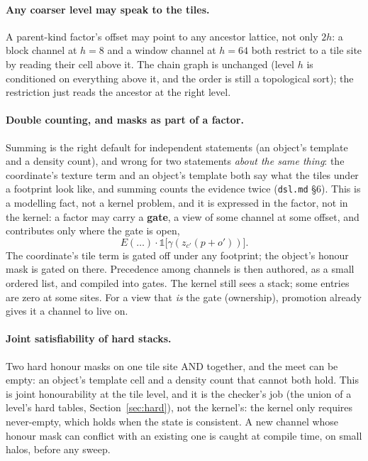 \documentclass[11pt]{article}
\newcommand{\1}{\mathds{1}}
\begin{document}
\paragraph{Any coarser level may speak to the tiles.} A parent-kind factor's
offset may point to any ancestor lattice, not only $2h$: a block channel at
$h = 8$ and a window channel at $h = 64$ both restrict to a tile site by
reading their cell above it. The chain graph is unchanged (level $h$ is
conditioned on everything above it, and the order is still a topological
sort); the restriction just reads the ancestor at the right level.

\paragraph{Double counting, and masks as part of a factor.} Summing is the
right default for independent statements (an object's template and a density
count), and wrong for two statements \emph{about the same thing}: the coordinate's
texture term and an object's template both say what the tiles under a
footprint look like, and summing counts the evidence twice (\texttt{dsl.md}
\S6). This is a modelling fact, not a kernel problem, and it is expressed in
the factor, not in the kernel: a factor may carry a \textbf{gate}, a view of
some channel at some offset, and contributes only where the gate is open,
\[
  E(\ldots)\cdot \1\big[\gamma(z_{c'}(p + o'))\big].
\]
The coordinate's tile term is gated off under any footprint; the object's
honour mask is gated on there. Precedence among channels is then authored, as
a small ordered list, and compiled into gates. The kernel still sees a stack;
some entries are zero at some sites. For a view that \emph{is} the gate
(ownership), promotion already gives it a channel to live on.

\paragraph{Joint satisfiability of hard stacks.} Two hard honour masks on one
tile site AND together, and the meet can be empty: an object's template cell
and a density count that cannot both hold. This is joint honourability at the
tile level, and it is the checker's job (the union of a level's hard tables,
Section~\ref{sec:hard}), not the kernel's: the kernel only requires
never-empty, which holds when the state is consistent. A new channel whose
honour mask can conflict with an existing one is caught at compile time, on
small halos, before any sweep.
\end{document}
